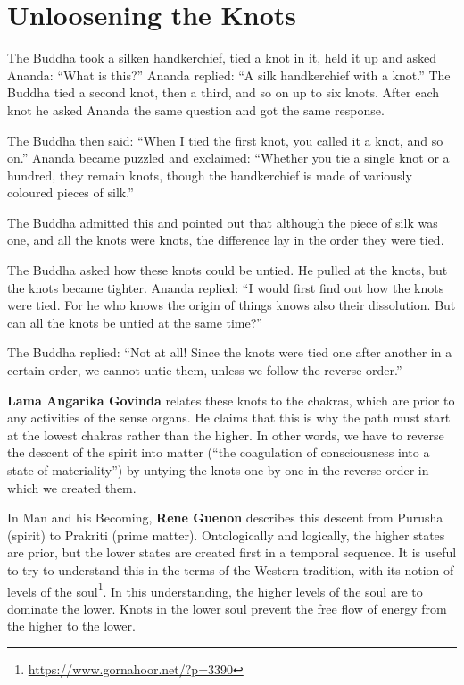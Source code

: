 \section{Unloosening the Knots}

\begin{quotationx}
The Buddha took a silken handkerchief, tied a knot in it, held it up and asked Ananda: ``What is this?'' Ananda replied: ``A silk handkerchief with a knot.'' The Buddha tied a second knot, then a third, and so on up to six knots. After each knot he asked Ananda the same question and got the same response.

The Buddha then said: ``When I tied the first knot, you called it a knot, and so on.'' Ananda became puzzled and exclaimed: ``Whether you tie a single knot or a hundred, they remain knots, though the handkerchief is made of variously coloured pieces of silk.''

The Buddha admitted this and pointed out that although the piece of silk was one, and all the knots were knots, the difference lay in the order they were tied.

The Buddha asked how these knots could be untied. He pulled at the knots, but the knots became tighter. Ananda replied: ``I would first find out how the knots were tied. For he who knows the origin of things knows also their dissolution. But can all the knots be untied at the same time?''

The Buddha replied: ``Not at all! Since the knots were tied one after another in a certain order, we cannot untie them, unless we follow the reverse order.''
\end{quotationx}


\textbf{Lama Angarika Govinda} relates these knots to the chakras, which are prior to any activities of the sense organs. He claims that this is why the path must start at the lowest chakras rather than the higher. In other words, we have to reverse the descent of the spirit into matter (``the coagulation of consciousness into a state of materiality'') by untying the knots one by one in the reverse order in which we created them.

In Man and his Becoming, \textbf{Rene Guenon} describes this descent from Purusha (spirit) to Prakriti (prime matter). Ontologically and logically, the higher states are prior, but the lower states are created first in a temporal sequence. It is useful to try to understand this in the terms of the Western tradition, with its notion of levels of the soul\footnote{\url{https://www.gornahoor.net/?p=3390}}. In this understanding, the higher levels of the soul are to dominate the lower. Knots in the lower soul prevent the free flow of energy from the higher to the lower.

